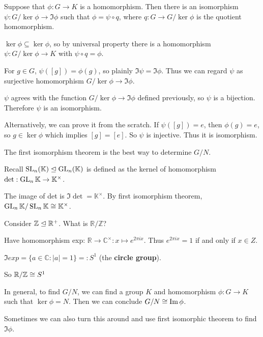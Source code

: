 \begin{thm}
Suppose that $\phi:G\to K$ is a homomorphism. Then there is an isomorphism $\psi:G/\ker\phi\to \Im\phi$ such that $\phi =\psi\circ q$, where $q:G\to G/\ker\phi$ is the quotient homomorphism.
\end{thm}

\begin{pf}
$\ker \phi\subseteq \ker\phi$, so by universal property there is a homomorphism $\psi: G/\ker\phi\to K$ with $\psi\circ q=\phi$.

For $g\in G$, $\psi([g])=\phi(g)$, so plainly $\Im \psi= \Im\phi$. Thus we can regard $\psi$ as surjective homomorphism $G/\ker\phi\to \Im\phi$.

$\psi$ agrees with the function $G/\ker \phi\to \Im\phi$ defined previously, so $\psi$ is a bijection. Therefore $\psi$ is an isomorphism.

Alternatively, we can prove it from the scratch. If $\psi([g])=e$, then $\phi(g)=e$, so $g\in \ker\phi$ which implies $[g]=[e]$. So $\psi$ is injective. Thus it is isomorphism.
\end{pf}
The first isomorphism theorem is the best way to determine $G/N$.
\begin{ex}
Recall $\operatorname{SL}_n (\mathbb{K})\trianglelefteq \operatorname{GL}_n (\mathbb{K})$ is defined as the kernel of homomorphism $\det:\operatorname{GL}_n \mathbb{K}\to \mathbb{K}^\times$.

The image of det is $\Im\det=\mathbb{K}^\times$.
By first isomorphism theorem, $\operatorname{GL}_n \mathbb{K}/\operatorname{SL}_n \mathbb{K}\cong \mathbb{K}^\times$.
\end{ex}

\begin{ex}
Consider $\mathbb{Z}\trianglelefteq \mathbb{R}^+$. What is $\mathbb{R}/\mathbb{Z}$?

Have homomorphism exp: $\mathbb{R}\to \mathbb{C}^\times: x\mapsto e^{2\pi ix}$. Thus $e^{2\pi ix}=1$ if and only if $x\in Z$.

$\Im exp = \{a\in \mathbb{C}:|a|=1\}=:S^1$ (the \textbf{circle group}).

So $\mathbb{R}/\mathbb{Z}\cong S^1$
\end{ex}

In general, to find $G/N$, we can find a group $K$ and homomorphism $\phi:G\to K$ such that $\ker\phi=N$. Then we can conclude $G/N\cong \operatorname{Im}\phi$. 

Sometimes we can also turn this around and use first isomorphic theorem to find $\Im\phi$.

